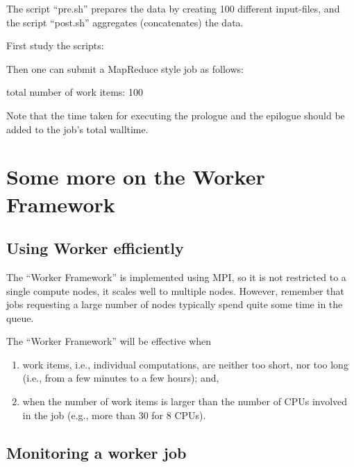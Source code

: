 \begin{prompt}
\end{prompt}

The script ``pre.sh'' prepares the data by creating 100 different input-files,
and the script ``post.sh'' aggregates (concatenates) the data.


First study the scripts:


Then one can submit a MapReduce style job as follows:

\begin{prompt}
total number of work items: 100
\end{prompt}

Note that the time taken for executing the prologue and the epilogue should be
added to the job's total walltime.

\section{Some more on the Worker Framework}

\subsection{Using Worker efficiently}

The ``Worker Framework'' is implemented using MPI, so it is not restricted to a
single compute nodes, it scales well to multiple nodes. However, remember that
jobs requesting a large number of nodes typically spend quite some time in the
queue.

The ``Worker Framework'' will be effective when

\begin{enumerate}
\item  work items, i.e., individual computations, are neither too short, nor too long (i.e., from a few minutes to a few hours); and,
\item  when the number of work items is larger than the number of CPUs involved in the job (e.g., more than 30 for 8 CPUs).
\end{enumerate}

\subsection{Monitoring a worker job}

